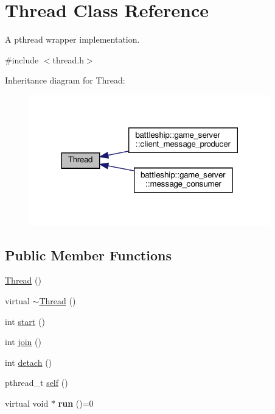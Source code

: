 \hypertarget{classThread}{}\section{Thread Class Reference}
\label{classThread}


A pthread wrapper implementation.  




{\ttfamily \#include $<$thread.\+h$>$}



Inheritance diagram for Thread\+:
\nopagebreak
\begin{figure}[H]
\begin{center}
\leavevmode
\includegraphics[width=297pt]{classThread__inherit__graph}
\end{center}
\end{figure}
\subsection*{Public Member Functions}
\begin{DoxyCompactItemize}
\item 
\hyperlink{classThread_a95c703fb8f2f27cb64f475a8c940864a}{Thread} ()
\item 
virtual \hyperlink{classThread_a37d9edd3a1a776cbc27dedff949c9726}{$\sim$\+Thread} ()
\item 
int \hyperlink{classThread_a7d563f3201d081af8cc24ea552c6a4e4}{start} ()
\item 
int \hyperlink{classThread_a7c3b04b32b4327923cc4c9553a403e32}{join} ()
\item 
int \hyperlink{classThread_a2a08036a4598cfc554114fee9d0e8485}{detach} ()
\item 
pthread\+\_\+t \hyperlink{classThread_ad4242a739c70bd1fe6b9c6e208714310}{self} ()
\item 
\mbox{\label{classThread_a0ceaa28981eacf1051845542053d82b6}} 
virtual void $\ast$ {\bfseries run} ()=0
\end{DoxyCompactItemize}


